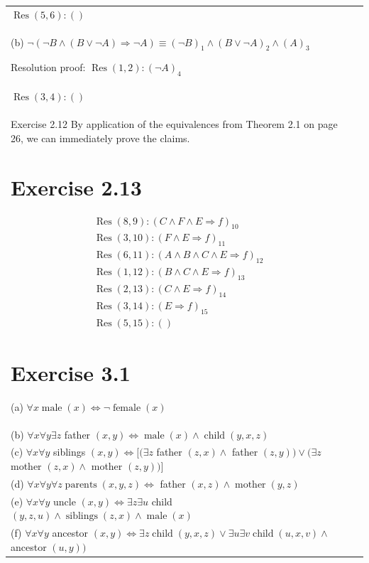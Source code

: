 \documentclass[10pt]{book}
\begin{document}
\begin{center}
\begin{tabular}{|l|l|l|}
$\operatorname{Res}(5,6):()$\\
(b) $\neg(\neg B \wedge(B \vee \neg A) \Rightarrow \neg A) \equiv(\neg B)_{1} \wedge(B \vee \neg A)_{2} \wedge(A)_{3}$

Resolution proof: $\operatorname{Res}(1,2):(\neg A)_{4}$\\
$\operatorname{Res}(3,4):()$\\
Exercise 2.12 By application of the equivalences from Theorem 2.1 on page 26, we can immediately prove the claims.

\section{Exercise 2.13}
$$
\begin{aligned}
& \operatorname{Res}(8,9):(C \wedge F \wedge E \Rightarrow f)_{10} \\
& \operatorname{Res}(3,10):(F \wedge E \Rightarrow f)_{11} \\
& \operatorname{Res}(6,11):(A \wedge B \wedge C \wedge E \Rightarrow f)_{12} \\
& \operatorname{Res}(1,12):(B \wedge C \wedge E \Rightarrow f)_{13} \\
& \operatorname{Res}(2,13):(C \wedge E \Rightarrow f)_{14} \\
& \operatorname{Res}(3,14):(E \Rightarrow f)_{15} \\
& \operatorname{Res}(5,15):()
\end{aligned}
$$

\section{Exercise 3.1}
(a) $\forall x \operatorname{male}(x) \Leftrightarrow \neg \operatorname{female}(x)$\\
(b) $\forall x \forall y \exists z$ father $(x, y) \Leftrightarrow \operatorname{male}(x) \wedge \operatorname{child}(y, x, z)$\\
(c) $\forall x \forall y$ siblings $(x, y) \Leftrightarrow[(\exists z$ father $(z, x) \wedge$ father $(z, y)) \vee(\exists z$ mother $(z, x) \wedge$ mother $(z, y))]$\\
(d) $\forall x \forall y \forall z \operatorname{parents}(x, y, z) \Leftrightarrow$ father $(x, z) \wedge \operatorname{mother}(y, z)$\\
(e) $\forall x \forall y$ uncle $(x, y) \Leftrightarrow \exists z \exists u$ child $(y, z, u) \wedge \operatorname{siblings}(z, x) \wedge \operatorname{male}(x)$\\
(f) $\forall x \forall y$ ancestor $(x, y) \Leftrightarrow \exists z \operatorname{child}(y, x, z) \vee \exists u \exists v \operatorname{child}(u, x, v) \wedge$ ancestor $(u, y))$


\end{tabular}
\end{center}
\end{document}
